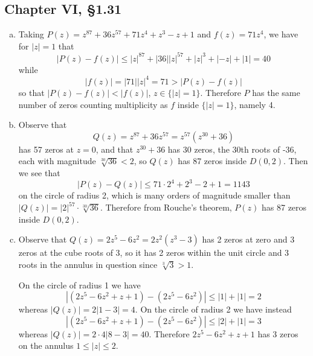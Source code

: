 \documentclass{article}
\begin{document}
\subsection*{Chapter VI, \S1.31}
\begin{enumerate}[(a)]
  \item{
    Taking $P(z) = z^{87} + 36z^{57} + 71z^4 + z^3 - z + 1$ and
    $f(z) = 71z^4$, we have for $|z| = 1$ that
    $$
         |P(z) - f(z)| 
    \leq |z|^{87} + |36||z|^{57} + |z|^3 + |-z| + |1|
    =    40
    $$
    while 
    $$
    |f(z)| = |71||z|^4 = 71 > |P(z) - f(z)|
    $$
    so that $|P(z) - f(z)| < |f(z)|$, $z \in \{|z| = 1\}$. Therefore
    $P$ has the same number of zeros counting multiplicity 
    as $f$ inside $\{|z| = 1\}$, namely 4.
  }
  \item{
    Observe that
    $$
    Q(z) = z^{87} + 36z^{57} = z^{57}(z^{30} + 36)
    $$
    has 57 zeros at $z = 0$, and that $z^{30} + 36$ has
    30 zeros, the 30th roots of -36, each with magnitude 
    $\sqrt[30]{36} < 2$,
    so $Q(z)$ has 87 zeros inside $D(0, 2)$.
    Then we see that
    $$
         |P(z) - Q(z)| 
    \leq 71 \cdot 2^4 + 2^3 - 2 + 1
    =    1143
    $$
    on the circle of radius 2, 
    which is many orders of magnitude smaller than
    $|Q(z)| = |2|^{57} \cdot \sqrt[30]{36}$. Therefore
    from Rouche's theorem, $P(z)$ has 87 zeros inside $D(0, 2)$.
  }
  \item{
    Observe that $Q(z) = 2z^5 - 6z^2 = 2z^2(z^3 - 3)$ has 2 zeros at zero and
    3 zeros at the cube roots of 3, so it has 2 zeros within the unit circle
    and 3 roots in the annulus in question since 
    $\sqrt[3]{3} > 1$.

    On the circle of radius 1 we have
    $$
    |(2z^5 - 6z^2 + z + 1) - (2z^5 - 6z^2)| \leq |1| + |1| = 2
    $$
    whereas $|Q(z)| = 2 |1 - 3| = 4$. On the circle of radius 2 we
    have instead
    $$
    |(2z^5 - 6z^2 + z + 1) - (2z^5 - 6z^2)| \leq |2| + |1| = 3
    $$
    whereas $|Q(z)| = 2 \cdot 4 |8 - 3| = 40$. Therefore 
    $2z^5 - 6z^2 + z + 1$ has 3 zeros on the annulus $1 \leq |z| \leq 2$.
  }
\end{enumerate}
\end{document}
